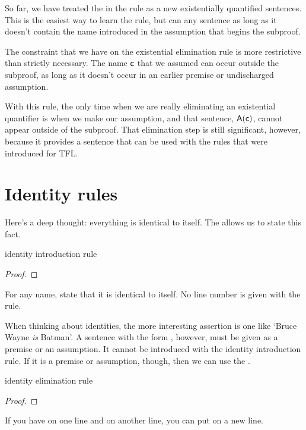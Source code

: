 \noindent So far, we have treated the  in the rule as a new existentially quantified sentences. This is the easiest way to learn the rule, but  can any sentence as long as it doesn't contain the name introduced in the assumption that begins the subproof.

\begin{notebox}
The constraint that we have on the existential elimination rule is more restrictive than strictly necessary. The name $\mathsf{c}$ that we assumed can occur outside the subproof, as long as it doesn't occur in an earlier premise or undischarged assumption.
\end{notebox}

With this rule, the only time when we are really eliminating an existential quantifier is when we make our assumption, and that sentence, $\mathsf{A(c)}$, cannot appear outside of the subproof. That elimination step is still significant, however, because it provides a sentence that can be used with the rules that were introduced for TFL.


\section{Identity rules}

Here's a deep thought: everything is identical to itself. The  allows us to state this fact.

\begin{factboxy}{identity introduction rule}
\begin{proof}
	 \ii{}
\end{proof}

\small{For any name, state that it is identical to itself. No line number is given with the rule.}
\end{factboxy}

When thinking about identities, the more interesting assertion is one like `Bruce Wayne \textit{is} Batman'. A sentence with the form , however, must be given as a premise or an assumption. It cannot be introduced with the identity introduction rule. If it is a premise or assumption, though, then we can use the .  

\begin{factboxy}{identity elimination rule}
\begin{proof}
	 
\end{proof}

\small{If you have  on one line and  on another line, you can put  on a new line.}
\end{factboxy}



